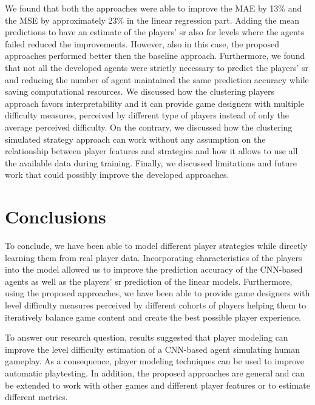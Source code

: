 We found that both the approaches were able to improve the \acs{MAE} by 13\% and the \acs{MSE} by approximately 23\% in the linear regression part. Adding the mean predictions to have an estimate of the players' \acs{sr} also for levels where the agents failed reduced the improvements. However, also in this case, the proposed approaches performed better then the baseline approach. 
Furthermore, we found that not all the developed agents were strictly necessary to predict the players' \acs{sr} and reducing the number of agent maintained the same prediction accuracy while saving computational resources. We discussed how the clustering players approach favors interpretability and it can provide game designers with multiple difficulty measures, perceived by different type of players instead of only the average perceived difficulty. On the contrary, we discussed how the clustering simulated strategy approach can work without any assumption on the relationship between player features and strategies and how it allows to use all the available data during training. Finally, we discussed limitations and future work that could possibly improve the developed approaches.

\section{Conclusions}
To conclude, we have been able to model different player strategies while directly learning them from real player data. Incorporating characteristics of the players into the model allowed us to improve the prediction accuracy of the \acs{CNN}-based agents as well as the players' \acs{sr} prediction of the linear models. Furthermore, using the proposed approaches, we have been able to provide game designers with level difficulty measures perceived by different cohorts of players helping them to iteratively balance game content and create the best possible player experience.

To answer our research question, results suggested that player modeling can improve the level difficulty estimation of a \acs{CNN}-based agent simulating human gameplay. As a consequence, player modeling techniques can be used to improve automatic playtesting. In addition, the proposed approaches are general and can be extended to work with other games and different player features or to estimate different metrics. 